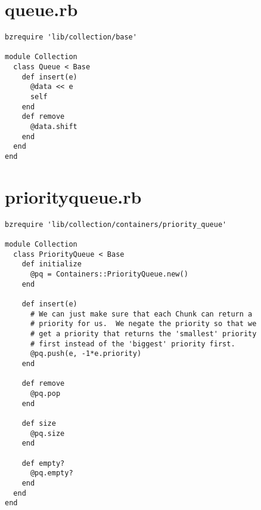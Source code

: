 \section{queue.rb}
\begin{verbatim}
bzrequire 'lib/collection/base'

module Collection
  class Queue < Base
    def insert(e)
      @data << e
      self
    end
    def remove
      @data.shift
    end
  end
end
\end{verbatim}

\section{priority\textunderscore queue.rb}
\begin{verbatim}
bzrequire 'lib/collection/containers/priority_queue'

module Collection
  class PriorityQueue < Base
    def initialize
      @pq = Containers::PriorityQueue.new()
    end

    def insert(e)
      # We can just make sure that each Chunk can return a
      # priority for us.  We negate the priority so that we
      # get a priority that returns the 'smallest' priority
      # first instead of the 'biggest' priority first.
      @pq.push(e, -1*e.priority)
    end

    def remove
      @pq.pop
    end

    def size
      @pq.size
    end

    def empty?
      @pq.empty?
    end
  end
end
\end{verbatim}